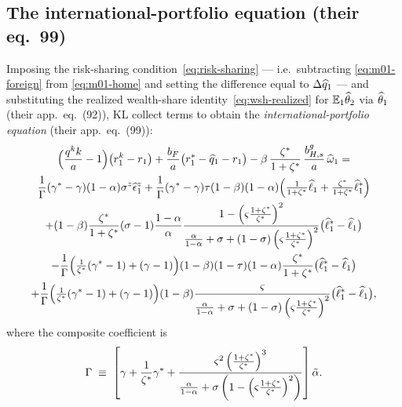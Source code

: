 \subsection{The international-portfolio equation (their eq.~99)}
\label{sec:eq99}

Imposing the risk-sharing condition~\eqref{eq:risk-sharing} --- i.e.\ subtracting
\eqref{eq:m01-foreign} from \eqref{eq:m01-home} and setting the difference equal
to $\Delta\widehat{q}_1$ --- and substituting the realized wealth-share
identity~\eqref{eq:wsh-realized} for $\mathbb{E}_1\widehat{\theta}_2$ via $\widehat{\theta}_1$
(their app.~eq.~(92)), KL collect terms to obtain the
\emph{international-portfolio equation} (their app.~eq.~(99)):
\begin{multline}
\Bigl(\frac{q^{k} k}{a}-1\Bigr)\bigl(r^{k}_1-r_1\bigr)
+\frac{b_F}{a}\bigl(r^{*}_1-\widehat{q}_1-r_1\bigr)
-\beta\,\frac{\zeta^{*}}{1+\zeta^{*}}\,\frac{b^g_{H,s}}{a}\,\widehat{\omega}_1
=\\
\frac{1}{\Gamma}(\gamma^{*}-\gamma)(1-\alpha)\sigma^z\widehat{\epsilon}^z_1
+\frac{1}{\Gamma}(\gamma^{*}-\gamma)\tau(1-\beta)(1-\alpha)\Bigl(\tfrac{1}{1+\zeta^{*}}\widehat{\ell}_1+\tfrac{\zeta^{*}}{1+\zeta^{*}}\widehat{\ell}^{*}_1\Bigr)\\
+(1-\beta)\frac{\zeta^{*}}{1+\zeta^{*}}(\sigma-1)\frac{1-\alpha}{\alpha}
\frac{1-\left(\varsigma\frac{1+\zeta^{*}}{\zeta^{*}}\right)^2}{\frac{\alpha}{1-\alpha}+\sigma+(1-\sigma)\left(\varsigma\frac{1+\zeta^{*}}{\zeta^{*}}\right)^2}\bigl(\widehat{\ell}^{*}_1-\widehat{\ell}_1\bigr)\\
-\frac{1}{\Gamma}\Bigl(\tfrac{1}{\zeta^{*}}(\gamma^{*}-1)+(\gamma-1)\Bigr)(1-\beta)(1-\tau)(1-\alpha)\frac{\zeta^{*}}{1+\zeta^{*}}\bigl(\widehat{\ell}^{*}_1-\widehat{\ell}_1\bigr)\\
+\frac{1}{\Gamma}\Bigl(\tfrac{1}{\zeta^{*}}(\gamma^{*}-1)+(\gamma-1)\Bigr)(1-\beta)
\frac{\varsigma}{\frac{\alpha}{1-\alpha}+\sigma+(1-\sigma)\left(\varsigma\frac{1+\zeta^{*}}{\zeta^{*}}\right)^2}\bigl(\widehat{\ell}^{*}_1-\widehat{\ell}_1\bigr), \label{eq:eq99}
\end{multline}
where the composite coefficient is
\begin{equation}
\Gamma \;\equiv\; \left[\gamma + \frac{1}{\zeta^{*}}\gamma^{*}
+\frac{\varsigma^2\left(\frac{1+\zeta^{*}}{\zeta^{*}}\right)^3}{\frac{\alpha}{1-\alpha}+\sigma\left(1-\left(\varsigma\frac{1+\zeta^{*}}{\zeta^{*}}\right)^2\right)}\right]\tilde{\alpha}. \label{eq:Gamma-def}
\end{equation}
